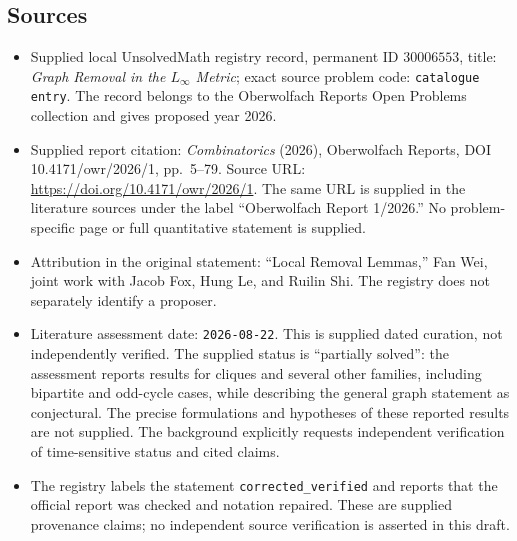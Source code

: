 \documentclass[11pt]{article}
\begin{document}
\subsection{Sources}
\begin{itemize}
\item Supplied local UnsolvedMath registry record, permanent ID \(30006553\), title: \emph{Graph Removal in the \(L_\infty\) Metric}; exact source problem code: \texttt{catalogue entry}. The record belongs to the Oberwolfach Reports Open Problems collection and gives proposed year 2026.
\item Supplied report citation: \emph{Combinatorics} (2026), Oberwolfach Reports, DOI 10.4171/owr/2026/1, pp.~5--79. Source URL: \url{https://doi.org/10.4171/owr/2026/1}. The same URL is supplied in the literature sources under the label ``Oberwolfach Report 1/2026.'' No problem-specific page or full quantitative statement is supplied.
\item Attribution in the original statement: ``Local Removal Lemmas,'' Fan Wei, joint work with Jacob Fox, Hung Le, and Ruilin Shi. The registry does not separately identify a proposer.
\item Literature assessment date: \texttt{2026-08-22}. This is supplied dated curation, not independently verified. The supplied status is ``partially solved'': the assessment reports results for cliques and several other families, including bipartite and odd-cycle cases, while describing the general graph statement as conjectural. The precise formulations and hypotheses of these reported results are not supplied. The background explicitly requests independent verification of time-sensitive status and cited claims.
\item The registry labels the statement \texttt{corrected\_verified} and reports that the official report was checked and notation repaired. These are supplied provenance claims; no independent source verification is asserted in this draft.
\end{itemize}
\end{document}
